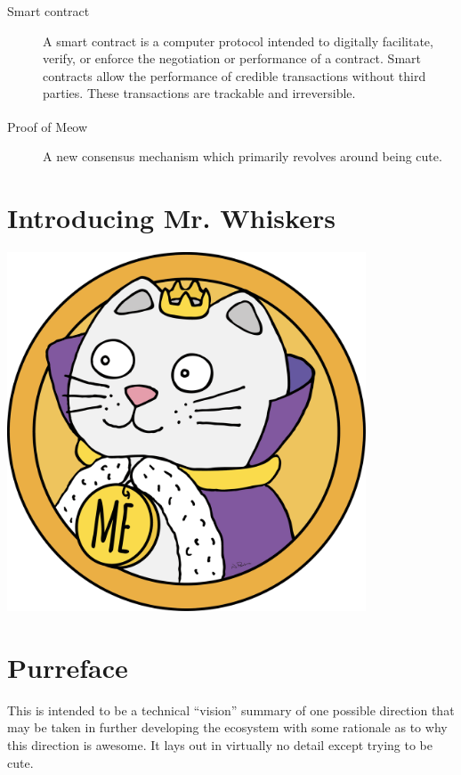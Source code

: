 \documentclass[9pt,oneside]{amsart}
\newenvironment{Figure}
  {\par\medskip\noindent\minipage{\linewidth}}
  {\endminipage\par\medskip}
\begin{document}
\begin{multicols}{2}
\begin{description}
    \item[Smart contract] A smart contract is a computer protocol intended to digitally facilitate, verify, or enforce the negotiation or performance of a contract. Smart contracts allow the performance of credible transactions without third parties. These transactions are trackable and irreversible.
    
    \item[Proof of Meow\textsuperscript{\textregistered}] A new consensus mechanism which primarily revolves around being cute.
\end{description}

\section{Introducing Mr. Whiskers}\label{sec:whiskers}
\begin{Figure}
    \medskip
    \centering
    \includegraphics[width=0.80\textwidth]{figures/mrwhiskerstokenme.png}
    \medskip
\end{Figure} 


\section{Purreface}\label{sec:preface}
 This is intended to be a technical ``vision'' summary of one possible direction that may be taken in further developing the \meow{} ecosystem with some rationale as to why this direction is awesome. It lays out in virtually no detail except trying to be cute.


\end{multicols}
\end{document}
